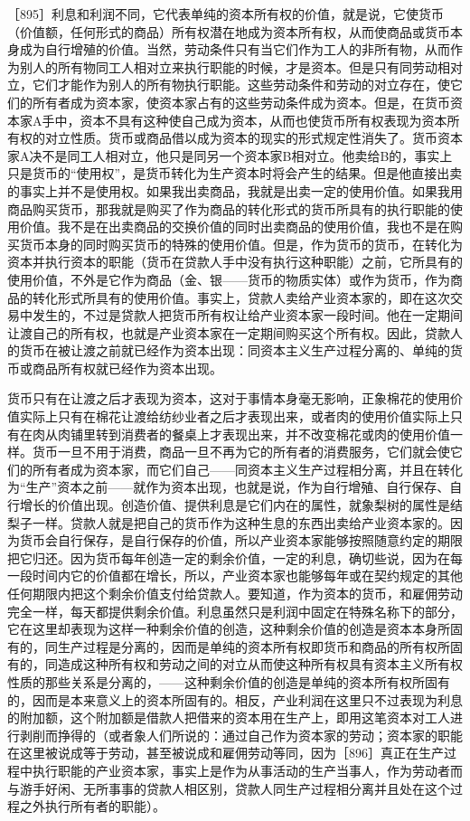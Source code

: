 ［895］利息和利润不同，它代表单纯的资本所有权的价值，就是说，它使货币（价值额，任何形式的商品）所有权潜在地成为资本所有权，从而使商品或货币本身成为自行增殖的价值。当然，劳动条件只有当它们作为工人的非所有物，从而作为别人的所有物同工人相对立来执行职能的时候，才是资本。但是只有同劳动相对立，它们才能作为别人的所有物执行职能。这些劳动条件和劳动的对立存在，使它们的所有者成为资本家，使资本家占有的这些劳动条件成为资本。但是，在货币资本家A手中，资本不具有这种使自己成为资本，从而也使货币所有权表现为资本所有权的对立性质。货币或商品借以成为资本的现实的形式规定性消失了。货币资本家A决不是同工人相对立，他只是同另一个资本家B相对立。他卖给B的，事实上只是货币的“使用权”，是货币转化为生产资本时将会产生的结果。但是他直接出卖的事实上并不是使用权。如果我出卖商品，我就是出卖一定的使用价值。如果我用商品购买货币，那我就是购买了作为商品的转化形式的货币所具有的执行职能的使用价值。我不是在出卖商品的交换价值的同时出卖商品的使用价值，我也不是在购买货币本身的同时购买货币的特殊的使用价值。但是，作为货币的货币，在转化为资本并执行资本的职能（货币在贷款人手中没有执行这种职能）之前，它所具有的使用价值，不外是它作为商品（金、银——货币的物质实体）或作为货币，作为商品的转化形式所具有的使用价值。事实上，贷款人卖给产业资本家的，即在这次交易中发生的，不过是贷款人把货币所有权让给产业资本家一段时间。他在一定期间让渡自己的所有权，也就是产业资本家在一定期间购买这个所有权。因此，贷款人的货币在被让渡之前就已经作为资本出现：同资本主义生产过程分离的、单纯的货币或商品所有权就已经作为资本出现。

货币只有在让渡之后才表现为资本，这对于事情本身毫无影响，正象棉花的使用价值实际上只有在棉花让渡给纺纱业者之后才表现出来，或者肉的使用价值实际上只有在肉从肉铺里转到消费者的餐桌上才表现出来，并不改变棉花或肉的使用价值一样。货币一旦不用于消费，商品一旦不再为它的所有者的消费服务，它们就会使它们的所有者成为资本家，而它们自己——同资本主义生产过程相分离，并且在转化为“生产”资本之前——就作为资本出现，也就是说，作为自行增殖、自行保存、自行增长的价值出现。创造价值、提供利息是它们内在的属性，就象梨树的属性是结梨子一样。贷款人就是把自己的货币作为这种生息的东西出卖给产业资本家的。因为货币会自行保存，是自行保存的价值，所以产业资本家能够按照随意约定的期限把它归还。因为货币每年创造一定的剩余价值，一定的利息，确切些说，因为在每一段时间内它的价值都在增长，所以，产业资本家也能够每年或在契约规定的其他任何期限内把这个剩余价值支付给贷款人。要知道，作为资本的货币，和雇佣劳动完全一样，每天都提供剩余价值。利息虽然只是利润中固定在特殊名称下的部分，它在这里却表现为这样一种剩余价值的创造，这种剩余价值的创造是资本本身所固有的，同生产过程是分离的，因而是单纯的资本所有权即货币和商品的所有权所固有的，同造成这种所有权和劳动之间的对立从而使这种所有权具有资本主义所有权性质的那些关系是分离的，——这种剩余价值的创造是单纯的资本所有权所固有的，因而是本来意义上的资本所固有的。相反，产业利润在这里只不过表现为利息的附加额，这个附加额是借款人把借来的资本用在生产上，即用这笔资本对工人进行剥削而挣得的（或者象人们所说的：通过自己作为资本家的劳动；资本家的职能在这里被说成等于劳动，甚至被说成和雇佣劳动等同，因为［896］真正在生产过程中执行职能的产业资本家，事实上是作为从事活动的生产当事人，作为劳动者而与游手好闲、无所事事的贷款人相区别，贷款人同生产过程相分离并且处在这个过程之外执行所有者的职能）。

